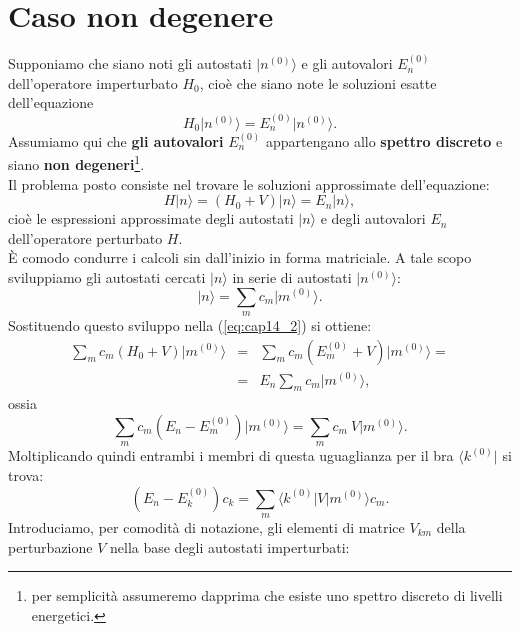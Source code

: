 \section{Caso non degenere}
Supponiamo che siano noti gli autostati $\vert n^{(0)} \rangle$ e gli autovalori $E_n ^{(0)}$ dell'operatore imperturbato $H_0$, cioè che siano note le soluzioni esatte dell'equazione
\begin{equation}
H_0\vert n^{(0)} \rangle=E_n ^{(0)}\vert n^{(0)} \rangle.
\label{eq:cap14_1}
\end{equation}
Assumiamo qui che \textbf{gli autovalori} $E_n ^{(0)}$ appartengano allo \textbf{spettro discreto} e siano \textbf{non degeneri}\footnote{per semplicità assumeremo dapprima che esiste uno spettro discreto di livelli energetici.}.\\
Il problema posto consiste nel trovare le soluzioni approssimate dell'equazione:
\begin{equation}
H\vert n \rangle=\left( H_0+ V \right) \vert n \rangle= E_n \vert n \rangle,
\label{eq:cap14_2}
\end{equation}
cioè le espressioni approssimate degli autostati $\vert n \rangle$ e degli autovalori $E_n$ dell'operatore perturbato $H$.\\
È comodo condurre i calcoli sin dall'inizio in forma matriciale. A tale scopo sviluppiamo gli autostati cercati $\vert n \rangle$ in serie di autostati $\vert n^{(0)} \rangle$:
\begin{equation}
\vert n \rangle= \sum _m c_m \vert m^{(0)} \rangle.
\label{eq:cap14_3}
\end{equation}
Sostituendo questo sviluppo nella (\ref{eq:cap14_2}) si ottiene:
\begin{eqnarray}
\sum _m c_m \left( H_0+V\right)\vert m^{(0)} \rangle &=&\sum _m c_m \left( E_m ^{(0)}+V\right)\vert m^{(0)} \rangle= \nonumber \\
&=&E_n\sum _m c_m \vert m^{(0)} \rangle,
\end{eqnarray}
ossia
\begin{equation}
\sum _m c_m \left( E_n-E_m ^{(0)}\right)\vert m^{(0)}\rangle=\sum _m c_m\ V\vert m^{(0)}\rangle.
\end{equation}
Moltiplicando quindi entrambi i membri di questa uguaglianza per il bra $\langle k^{(0)}\vert$ si trova:
\begin{equation}
\left( E_n-E_k ^{(0)}\right)c_k =\sum _m \langle k^{(0)}\vert V\vert m^{(0)}\rangle c_m.
\label{eq:cap14_4}
\end{equation}
Introduciamo, per comodità di notazione, gli elementi di matrice $V_{km}$ della perturbazione $V$ nella base degli autostati imperturbati:
